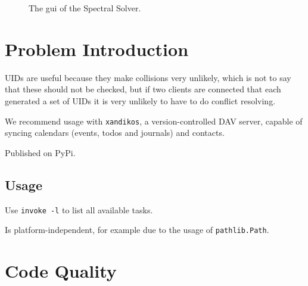 \documentclass{prettytex/ox/mmsc-special-topic}
\title{\topictitle}
\author{Candidate \candidatenumber}
\date{\today}
\begin{document}
  \pagestyle{plain}
  \mmscSpecialHeader

  \begin{abstract}
    \label{abstract}
    In this project report we will review the central concepts utilised in the group work conducted to make progress in the \gls{pde} problem associated with the electrochemical model of a battery cell and present numerical results.
    \vspace*{0.2cm}

    \noindent
    \textbf{Our Goal:}
    Numerically obtain the solution $\{a(x, T), b(x, T)\}$.

    The Finite Difference schemes are implemented in Julia and Python, whereas the Spectral Method is implemented in C++.
  \end{abstract}

  \begin{figure}[H]
    \centering
    \caption{The \gls{gui} of the Spectral Solver.}
    \label{fig:gui}
  \end{figure}

  \pagebreak
  \pagestyle{normal}

  \section{Problem Introduction}
  \label{sec:introduction}

  UIDs are useful because they make collisions very unlikely, which is not to say that these should not be checked, but if two clients are connected that each generated a set of UIDs it is very unlikely to have to do conflict resolving.

  We recommend usage with \texttt{xandikos}, a version-controlled DAV server, capable of syncing calendars (events, todos and journals) and contacts.

  Published on PyPi.

  \subsection{Usage}
  Use \texttt{invoke -l} to list all available tasks.

  Is platform-independent, for example due to the usage of \texttt{pathlib.Path}.

  \section{Code Quality}
\end{document}
